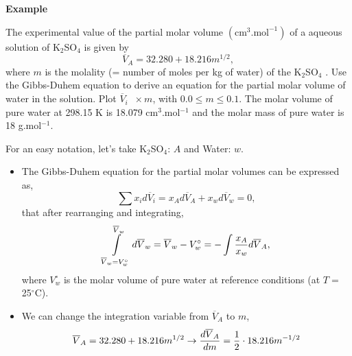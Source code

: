    \begin{MyExample}{\begin{center}{\bf Example}\end{center}}
     \begin{example}\label{Chapter:SolutionThermodynamics:Example4} %
          The experimental value of the partial molar volume $\left(\text{cm}^{3}\text{.mol}^{-1}\right)$ of a aqueous solution of K$_{2}$SO$_{4}$ is given by
                \begin{displaymath}
                   \overline{V}_{A} = 32.280 + 18.216 m^{1/2},
                \end{displaymath} 
 where $m$ is the molality (= number of moles per kg of water) of the K$_{2}$SO$_{4}$ . Use the Gibbs-Duhem equation to derive an equation for the partial molar volume of water in the solution. Plot $\overline{V}_{i}\;\;\times m$, with $0.0\leq m\leq 0.1$. The molar volume of pure water at 298.15 K is 18.079 cm$^{3}$.mol$^{-1}$ and the molar mass of pure water is 18 g.mol$^{-1}$.
     \end{example}

           For an easy notation, let's take K$_{2}$SO$_{4}$: $A$ and Water: $w$.
\begin{itemize}
  \item The Gibbs-Duhem equation for the partial molar volumes can be expressed as,
     \begin{displaymath}
        \sum\limits x_{i}d\overline{V}_{i} = x_{A} d\overline{V}_{A} + x_{w} d\overline{V}_{w} = 0,
     \end{displaymath}
     that after rearranging and integrating,
     \begin{displaymath}
        \int\limits_{\overline{V}_{w}=V_{w}^{\circ}}^{\overline{V}_{w}}d\overline{V}_{w} = \overline{V}_{w} - V_{w}^{\circ} = -\int\displaystyle\frac{x_{A}}{x_{w}} d\overline{V}_{A},
     \end{displaymath}
     where $V_{w}^{\circ}$ is the molar volume of pure water at reference conditions (\ie at $T=$ 25$^{\circ}$C).

  \item We can change the integration variable from $\overline{V}_{A}$ to $m$,
      \begin{displaymath}
         \overline{V}_{A} = 32.280 + 18.216 m^{1/2} \rightarrow \displaystyle\frac{d\overline{V}_{A}}{dm} = \displaystyle\frac{1}{2}\cdot 18.216 m^{-1/2} 
      \end{displaymath} 
  

\end{itemize}
\end{MyExample}
